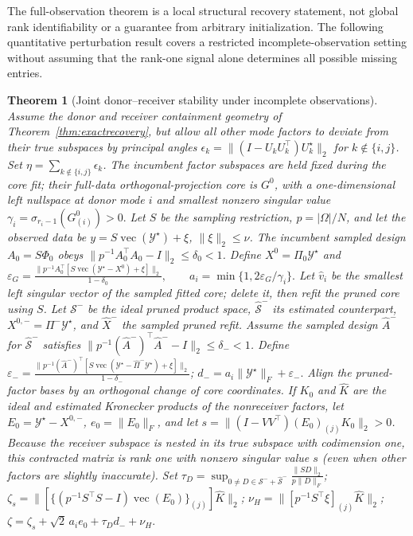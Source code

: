 \documentclass[review,10pt]{elsarticle}
\newtheorem{theorem}{Theorem}
\newcommand{\cY}{\mathcal Y}
\begin{document}
The full-observation theorem is a local structural recovery statement, not global rank identifiability or a guarantee from arbitrary initialization. The following quantitative perturbation result covers a restricted incomplete-observation setting without assuming that the rank-one signal alone determines all possible missing entries.


\begin{theorem}[Joint donor--receiver stability under incomplete observations]\label{thm:stability}
Assume the donor and receiver containment geometry of Theorem~\ref{thm:exactrecovery}, but allow all other mode factors to deviate from their true subspaces by principal angles $\epsilon_k=\|(I-U_kU_k^\top)U_k^\star\|_2$ for $k\notin\{i,j\}$. Set $\eta=\sum_{k\notin\{i,j\}}\epsilon_k$. The incumbent factor subspaces are held fixed during the core fit; their full-data orthogonal-projection core is $G^0$, with a one-dimensional left nullspace at donor mode $i$ and smallest nonzero singular value
 \(\gamma_i=\sigma_{r_i-1}(G^0_{(i)})>0.\) 
Let $S$ be the sampling restriction, $p=|\Omega|/N$, and let the observed data be $y=S\operatorname{vec}(\cY^\star)+\xi$, $\|\xi\|_2\le\nu$. The incumbent sampled design $A_0=S\Phi_0$ obeys $\|p^{-1}A_0^\top A_0-I\|_2\le\delta_0<1$. Define $X^0=\Pi_0\cY^\star$ and
 \(\varepsilon_G= \frac{\|p^{-1}A_0^\top[S\operatorname{vec}(\cY^\star-X^0)+\xi]\|_2}{1-\delta_0}, \qquad a_i=\min\{1,2\varepsilon_G/\gamma_i\}.\) 
Let $\widehat v_i$ be the smallest left singular vector of the \emph{sampled fitted} core; delete it, then refit the pruned core using $S$. Let $\mathcal S^-$ be the ideal pruned product space, $\widehat{\mathcal S}^-$ its estimated counterpart, $X^{0,-}=\Pi^-\cY^\star$, and $\widehat X^-$ the sampled pruned refit. Assume the sampled design $\widehat A^-$ for $\widehat{\mathcal S}^-$ satisfies $\|p^{-1}(\widehat A^-)^\top\widehat A^--I\|_2\le\delta_-<1$. Define
 \(\varepsilon_-=\frac{\|p^{-1}(\widehat A^-)^\top[S\operatorname{vec}(\cY^\star-\widehat\Pi^-\cY^\star)+\xi]\|_2}{1-\delta_-}\); \(d_-=a_i\|\cY^\star\|_F+\varepsilon_-.\) 
Align the pruned-factor bases by an orthogonal change of core coordinates. If $K_0$ and $\widehat K$ are the ideal and estimated Kronecker products of the nonreceiver factors, let $E_0=\cY^\star-X^{0,-}$, $e_0=\|E_0\|_F$, and let $s=\|(I-VV^\top)(E_0)_{(j)}K_0\|_2>0$. Because the receiver subspace is nested in its true subspace with codimension one, this contracted matrix is rank one with nonzero singular value $s$ (even when other factors are slightly inaccurate). Set
 \(\tau_D=\sup_{0\neq D\in\mathcal S^-+\widehat{\mathcal S}^-} \frac{\|SD\|_2}{p\|D\|_F}\); \(\zeta_s=\|[\{(p^{-1}S^\top S-I)\operatorname{vec}(E_0)\}_{(j)}]\widehat K\|_2\); \(\nu_H=\|[p^{-1}S^\top\xi]_{(j)}\widehat K\|_2\); \(\zeta=\zeta_s+\sqrt2\,a_i e_0+\tau_D d_-+\nu_H.\) 

\end{theorem}
\end{document}
